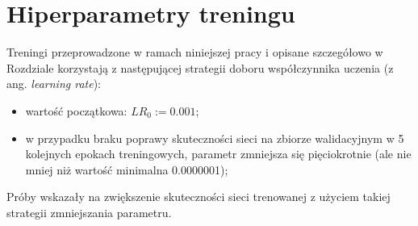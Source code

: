 \section{Hiperparametry treningu}

Treningi przeprowadzone w ramach niniejszej pracy i opisane szczegółowo w Rozdziale  korzystają z następującej strategii doboru współczynnika uczenia (z ang. \textit{learning rate}):
\begin{itemize}
  \item wartość początkowa: $LR_{0} := 0.001$;
  \item w przypadku braku poprawy skuteczności sieci na zbiorze walidacyjnym w 5 kolejnych epokach treningowych, parametr zmniejsza się pięciokrotnie (ale nie mniej niż wartość minimalna 0.0000001);
\end{itemize}

Próby wskazały na zwiększenie skuteczności sieci trenowanej z użyciem takiej strategii zmniejszania parametru.
